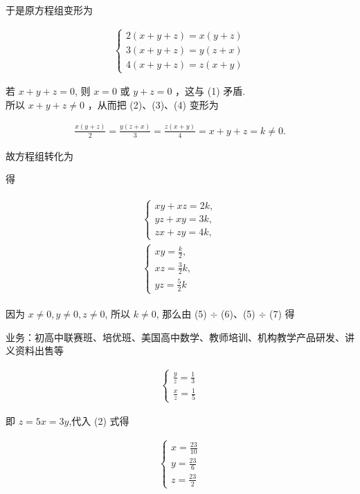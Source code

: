 \documentclass[10pt]{article}
\begin{document}
于是原方程组变形为

\begin{align*}
\left\{\begin{array}{l}
2(x+y+z)=x(y+z)  \tag{2}\\
3(x+y+z)=y(z+x) \\
4(x+y+z)=z(x+y)
\end{array}\right.
\end{align*}

若 $x+y+z=0$, 则 $x=0$ 或 $y+z=0$ ，这与 (1) 矛盾.\\
所以 $x+y+z \neq 0$ ，从而把 (2)、(3)、(4) 变形为

\begin{align*}
\frac{x(y+z)}{2}=\frac{y(z+x)}{3}=\frac{z(x+y)}{4}=x+y+z=k \neq 0 .
\end{align*}

故方程组转化为

得

\begin{align*}
\begin{gather*}
\left\{\begin{array}{l}
x y+x z=2 k, \\
y z+x y=3 k, \\
z x+z y=4 k,
\end{array}\right. \\
\left\{\begin{array}{l}
x y=\frac{k}{2}, \\
x z=\frac{3}{2} k, \\
y z=\frac{5}{2} k
\end{array}\right.
\end{gather*} \tag{5}
\end{align*}

因为 $x \neq 0, y \neq 0, z \neq 0$, 所以 $k \neq 0$, 那么由 (5) $\div$ (6)、(5) $\div$ (7) 得

业务：初高中联赛班、培优班、美国高中数学、教师培训、机构教学产品研发、讲义资料出售等

\begin{align*}
\left\{\begin{array}{l}
\frac{y}{z}=\frac{1}{3} \\
\frac{x}{z}=\frac{1}{5}
\end{array}\right.
\end{align*}

即 $z=5 x=3 y$,代入 (2) 式得

\begin{align*}
\left\{\begin{array}{l}
x=\frac{23}{10} \\
y=\frac{23}{6} \\
z=\frac{23}{2}
\end{array}\right.
\end{align*}
\end{document}
